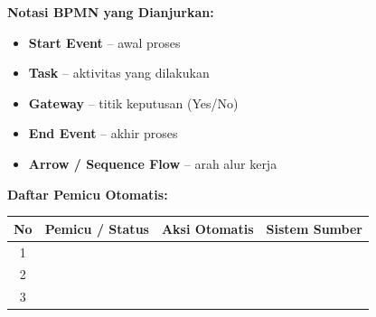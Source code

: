 \documentclass[12pt,a4paper]{report}
\begin{document}
\vspace{0.4cm}

\newcommand{\symstart}{\raisebox{-1pt}{\tikz\draw[green!60!black, fill=green!15] (0,0) circle (3.5pt);}}
\newcommand{\symtask}{\raisebox{-1pt}{\tikz\draw[plnblue, fill=plnblue!10, rounded corners=1pt] (-4pt,-2.5pt) rectangle (4pt,2.5pt);}}
\newcommand{\symgateway}{\raisebox{-1pt}{\tikz\draw[plnorange!80!black, fill=plnorange!10] (0,0) -- (3.5pt,3.5pt) -- (0,7pt) -- (-3.5pt,3.5pt) -- cycle;}}
\newcommand{\symend}{\raisebox{-1pt}{\tikz\draw[plnblue!80!black, fill=plnblue!20, line width=1pt] (0,0) circle (3.5pt);}}
\newcommand{\symarrow}{\raisebox{-1pt}{{\color{plnblue}$\longrightarrow$}}}

\begin{tipbox}
\textbf{Notasi BPMN yang Dianjurkan:}
\begin{itemize}
    \item[\symstart] \textbf{Start Event} -- awal proses
    \item[\symtask] \textbf{Task} -- aktivitas yang dilakukan
    \item[\symgateway] \textbf{Gateway} -- titik keputusan (Yes/No)
    \item[\symend] \textbf{End Event} -- akhir proses
    \item[\symarrow] \textbf{Arrow / Sequence Flow} -- arah alur kerja
\end{itemize}
\end{tipbox}

\vspace{0.3cm}

\noindent\textbf{Daftar Pemicu Otomatis:}

\vspace{0.2cm}

\noindent
{\small
\renewcommand{\arraystretch}{2.0}
\begin{tabularx}{\textwidth}{@{} c >{\raggedright\arraybackslash}X >{\raggedright\arraybackslash}X >{\raggedright\arraybackslash}X @{}}
\toprule
\textbf{No} & \textbf{Pemicu / Status} & \textbf{Aksi Otomatis} & \textbf{Sistem Sumber} \\
\midrule
1 & & & \\
\hline
2 & & & \\
\hline
3 & & & \\
\bottomrule
\end{tabularx}
\renewcommand{\arraystretch}{1.0}
}


\newpage
\end{document}
